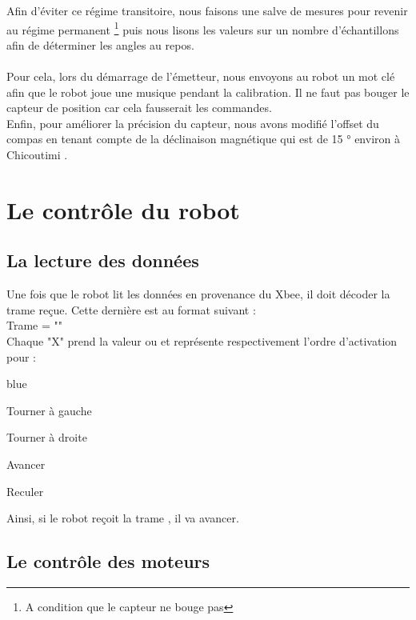 {Afin d'éviter ce régime transitoire, nous faisons une salve de mesures pour revenir au régime permanent \footnote{A condition que le capteur ne bouge pas} puis nous lisons les valeurs sur un nombre d'échantillons afin de déterminer les angles au repos. \\

\\

Pour cela, lors du démarrage de l'émetteur, nous envoyons au robot un mot clé afin que le robot joue une musique pendant la calibration. Il ne faut pas bouger le capteur de position car cela fausserait les commandes. \\

Enfin, pour améliorer la précision du capteur, nous avons modifié l'offset du compas en tenant compte de la déclinaison magnétique qui est de 15 ° environ à Chicoutimi \cite{mag}.


\section{Le contrôle du robot}


\subsection{La lecture des données}
Une fois que le robot lit les données en provenance du Xbee, il doit décoder la trame reçue. Cette dernière est au format suivant : \\

Trame = ""\\

Chaque "X" prend la valeur  ou  et représente respectivement l'ordre d'activation pour :

\begin{items}{blue}{\Bullet}
    \item Tourner à gauche
    \item Tourner à droite
    \item Avancer
    \item Reculer
\end{items}


Ainsi, si le robot reçoit la trame , il va avancer.

\subsection{Le contrôle des moteurs}

}
